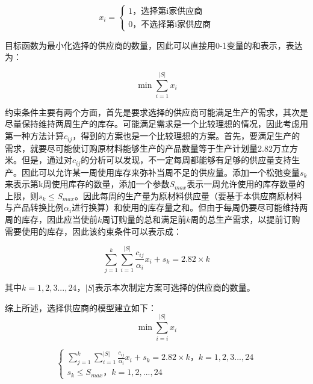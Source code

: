 \documentclass[withoutpreface,bwprint]{cumcmthesis} %
\begin{document}
\begin{equation}
    x_i=
    \begin{cases}
        1\text{，选择第i家供应商}\\
        0\text{，不选择第i家供应商}
    \end{cases}
\end{equation}

目标函数为最小化选择的供应商的数量，因此可以直接用0-1变量的和表示，表达为：

\begin{equation}
    \min \sum_{i = 1}^{|S|}  x_i
\end{equation}

约束条件主要有两个方面，首先是要求选择的供应商可能满足生产的需求，其次是尽量保持维持两周生产的库存。可能满足需求是一个比较理想的情况，因此考虑用第一种方法计算$c_{i j}$，得到的方案也是一个比较理想的方案。首先，要满足生产的需求，就要尽可能使订购原材料能够生产的产品数量等于生产计划量2.82万立方米。但是，通过对$c_{i j}$的分析可以发现，不一定每周都能够有足够的供应量支持生产。因此可以允许某一周使用库存来弥补当周不足的供应量。添加一个松弛变量$s_k$来表示第k周使用库存的数量，添加一个参数$S_{max}$表示一周允许使用的库存数量的上限，则$s_k\leq S_{max} $。因此每周的生产量为原材料供应量（要基于本供应商原材料与产品转换比例${\alpha_i }$进行换算）和使用的库存量之和。但由于每周仍要尽可能维持两周的库存，因此应当使前$k$周订购量的总和满足前$k$周的总生产需求，以提前订购需要使用的库存，因此该约束条件可以表示成：

\begin{equation}
        \sum_{j = 1}^{k}  \sum_{i = 1}^{|S|} \frac{c_{i j}}{\alpha_i}x_i+s_k=2.82\times k
        \label{满足生产约束条件}
\end{equation}

其中$k=1,2,3...,24$，$|S|$表示本次制定方案可选择的供应商的数量。

综上所述，选择供应商的模型建立如下：
\begin{equation}
    \min \sum_{i = i}^{|S|} x_i 
\end{equation}

\begin{equation}
    \begin{cases}
        \sum_{j = 1}^{k}  \sum_{i = 1}^{|S|} \frac{c_{i j}}{\alpha_i}x_i+s_k=2.82\times k\text{，}k=1,2,3...,24\\
        s_k\leq S_{m a x}\text{，}k=1,2,...,24
    \end{cases}
\end{equation}
\end{document}
